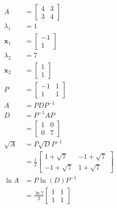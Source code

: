 \documentclass{article}
\renewcommand{\vec}[1]{\boldsymbol{\mathbf{#1}}}
\begin{document}
\begin{align*}
  A         & = \begin{bmatrix}
                  4 & 3 \\
                  3 & 4
                \end{bmatrix}                            \\
  \lambda_1 & = 1                                         \\
  \vec{x}_1 & = \begin{bmatrix}
                  -1 \\
                  1
                \end{bmatrix}                            \\
  \lambda_2 & = 7                                         \\
  \vec{x}_2 & = \begin{bmatrix}
                  1 \\
                  1
                \end{bmatrix}                            \\
  P         & = \begin{bmatrix}
                  -1 & 1 \\
                  1  & 1
                \end{bmatrix}                            \\
  A         & = P D P^{-1}                                \\
  D         & = P^{-1} A P                                \\
            & = \begin{bmatrix}
                  1 & 0 \\
                  0 & 7
                \end{bmatrix}                            \\
  \sqrt{A}  & = P \sqrt{D} P^{-1}                         \\
            & = \frac{1}{2} \begin{bmatrix}
                              1 + \sqrt{7}  & -1 + \sqrt{7} \\
                              -1 + \sqrt{7} & 1 + \sqrt{7}
                            \end{bmatrix} \\
  \ln A     & = P \ln (D) P^{-1}                          \\
            & = \frac{\ln 7}{2} \begin{bmatrix}
                                  1 & 1 \\
                                  1 & 1
                                \end{bmatrix}
\end{align*}
\end{document}
